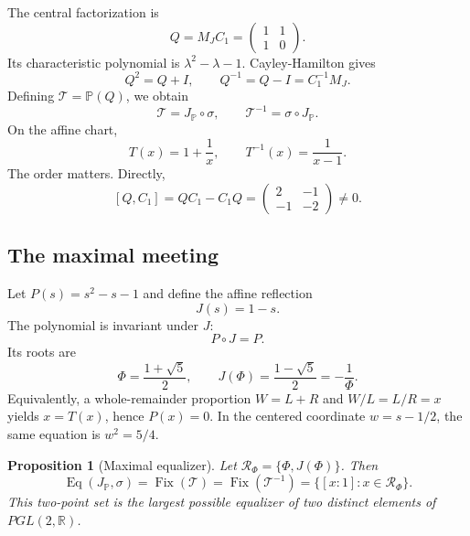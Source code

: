 \documentclass[10pt,oneside]{article}
\theoremstyle{plaincompact}
\newtheorem{proposition}[theorem]{Proposition}
\theoremstyle{definitioncompact}
\newcommand{\R}{\mathbb R}
\newcommand{\Fix}{\operatorname{Fix}}
\newcommand{\Eq}{\operatorname{Eq}}
\newcommand{\cT}{\mathcal T}
\begin{document}
The central factorization is
\begin{equation}\label{eq:factorization}
\boxed{
Q=M_JC_1=
\begin{pmatrix}1&1\\1&0\end{pmatrix}.}
\end{equation}
Its characteristic polynomial is $\lambda^2-\lambda-1$.  Cayley-Hamilton gives
\begin{equation}\label{eq:refinementlaw}
Q^2=Q+I,\qquad Q^{-1}=Q-I=C_1^{-1}M_J.
\end{equation}
Defining $\cT=\mathbb P(Q)$, we obtain
\begin{equation}\label{eq:orderedcomposition}
\cT=J_{\mathbb P}\circ\sigma,\qquad
\cT^{-1}=\sigma\circ J_{\mathbb P}.
\end{equation}
On the affine chart,
\begin{equation}\label{eq:T}
T(x)=1+\frac1x,\qquad T^{-1}(x)=\frac1{x-1}.
\end{equation}
The order matters.  Directly,
\begin{equation}\label{eq:commutator}
[Q,C_1]=QC_1-C_1Q=
\begin{pmatrix}2&-1\\-1&-2\end{pmatrix}\ne0.
\end{equation}

\subsection{The maximal meeting}

Let $P(s)=s^2-s-1$ and define the affine reflection
\begin{equation}\label{eq:J}
J(s)=1-s.
\end{equation}
The polynomial is invariant under $J$:
\begin{equation}\label{eq:Pinvariance}
P\circ J=P.
\end{equation}
Its roots are
\begin{equation}\label{eq:roots}
\Phi=\frac{1+\sqrt5}{2},\qquad
J(\Phi)=\frac{1-\sqrt5}{2}=-\frac1\Phi.
\end{equation}
Equivalently, a whole-remainder proportion $W=L+R$ and
$W/L=L/R=x$ yields $x=T(x)$, hence $P(x)=0$.  In the centered coordinate
$w=s-1/2$, the same equation is $w^2=5/4$.

\begin{proposition}[Maximal equalizer]\label{prop:equalizer}
Let $\mathcal R_\Phi=\{\Phi,J(\Phi)\}$.  Then
\begin{equation}\label{eq:equalizer}
\Eq(J_{\mathbb P},\sigma)=\Fix(\cT)=\Fix(\cT^{-1})
=\{[x:1]:x\in\mathcal R_\Phi\}.
\end{equation}
This two-point set is the largest possible equalizer of two distinct elements
of $PGL(2,\R)$.
\end{proposition}
\end{document}
